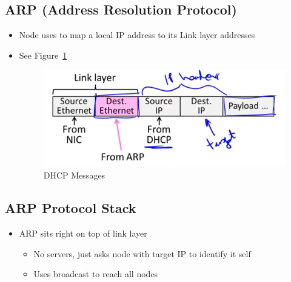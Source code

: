\documentclass[12pt]{ctexart}   %
\begin{document}
	\subsection{ARP (Address Resolution Protocol)}
	\begin{itemize}
		\item Node uses to map a local IP address to its Link layer addresses
		\item See Figure~\ref{fig:4-6-3}
		
		\begin{figure}[h!] %
		\centering
		 \includegraphics[scale=0.7]{images/4-6-3}
		\caption{DHCP Messages}
		 \label{fig:4-6-3}
		 \end{figure}
	\end{itemize}
	
	\subsection{ARP Protocol Stack}
	\begin{itemize}
		\item ARP sits right on top of link layer
		\begin{itemize}
			\item No servers, just asks node with target IP to identify it self
			\item Uses broadcast to reach all nodes
		\end{itemize}
	\end{itemize}
	
\end{document}
